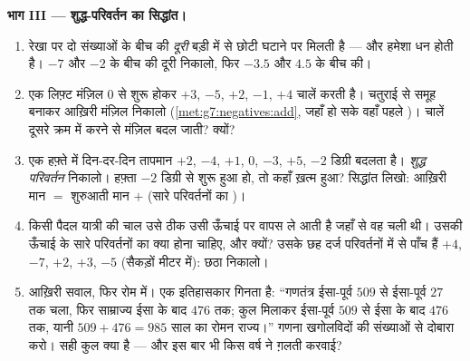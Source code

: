 \begin{problem}
\medskip
\noindent\textbf{भाग III --- शुद्ध-परिवर्तन का सिद्धांत।}
\begin{enumerate}[resume]
  \item रेखा पर दो संख्याओं के बीच की \emph{दूरी} बड़ी में से
        छोटी घटाने पर मिलती है --- और हमेशा धन होती है।
        $-7$ और $-2$ के बीच की दूरी निकालो, फिर
        $-3.5$ और $4.5$ के बीच की।
  \item एक लिफ़्ट मंज़िल $0$ से शुरू होकर $+3$,
        $-5$, $+2$, $-1$, $+4$ चालें करती है। चतुराई से समूह
        बनाकर आख़िरी मंज़िल निकालो (\cref{met:g7:negatives:add},
        जहाँ हो सके वहाँ पहले )। चालें दूसरे क्रम
        में करने से मंज़िल बदल जाती? क्यों?
  \item एक हफ़्ते में दिन-दर-दिन तापमान $+2$, $-4$, $+1$,
        $0$, $-3$, $+5$, $-2$ डिग्री बदलता है।
        \emph{शुद्ध परिवर्तन} निकालो। हफ़्ता $-2$ डिग्री से शुरू
        हुआ हो, तो कहाँ ख़त्म हुआ? सिद्धांत लिखो: आख़िरी मान $=$
        शुरुआती मान $+$ (सारे परिवर्तनों का )।
  \item किसी पैदल यात्री की चाल उसे ठीक उसी ऊँचाई पर वापस ले आती
        है जहाँ से वह चली थी। उसकी ऊँचाई के सारे परिवर्तनों का
         क्या होना चाहिए, और क्यों? उसके छह दर्ज
        परिवर्तनों में से पाँच हैं $+4$, $-7$, $+2$, $+3$, $-5$
        (सैकड़ों मीटर में): छठा निकालो।
  \item आख़िरी सवाल, फिर रोम में। एक इतिहासकार गिनता है:
        ``गणतंत्र ईसा-पूर्व $509$ से ईसा-पूर्व $27$ तक चला, फिर
        साम्राज्य ईसा के बाद $476$ तक; कुल मिलाकर ईसा-पूर्व
        $509$ से ईसा के बाद $476$ तक, यानी
        $509 + 476 = 985$ साल का रोमन राज्य।'' गणना खगोलविदों की
        संख्याओं से दोबारा करो। सही कुल क्या है --- और इस बार भी
        किस वर्ष ने ग़लती करवाई?
\end{enumerate}
\end{problem}
